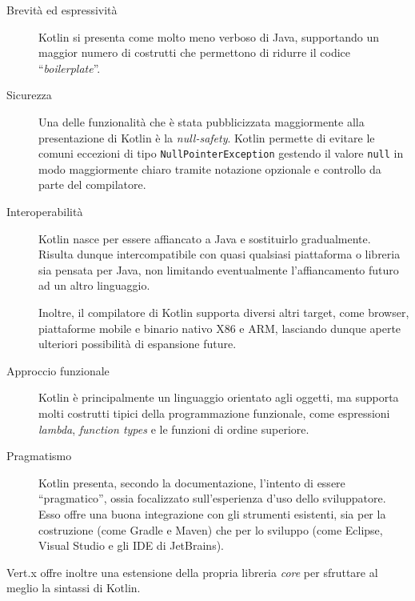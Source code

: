       \begin{description}
        \item[Brevità ed espressività]
          Kotlin si presenta come molto meno verboso di Java, supportando un maggior numero di costrutti che permettono di ridurre il codice ``\emph{boilerplate}''.

        \item[Sicurezza]
          Una delle funzionalità che è stata pubblicizzata maggiormente alla presentazione di Kotlin è la \emph{null-safety}.
          Kotlin permette di evitare le comuni eccezioni di tipo \texttt{NullPointerException} gestendo il valore \texttt{null} in modo maggiormente chiaro tramite notazione opzionale e controllo da parte del compilatore.

        \item[Interoperabilità]
          Kotlin nasce per essere affiancato a Java e sostituirlo gradualmente.
          Risulta dunque intercompatibile con quasi qualsiasi piattaforma o libreria sia pensata per Java, non limitando eventualmente l'affiancamento futuro ad un altro linguaggio.

          Inoltre, il compilatore di Kotlin supporta diversi altri target, come browser, piattaforme mobile e binario nativo X86 e ARM, lasciando dunque aperte ulteriori possibilità di espansione future.

        \item[Approccio funzionale]
          Kotlin è principalmente un linguaggio orientato agli oggetti, ma supporta molti costrutti tipici della programmazione funzionale, come espressioni \emph{lambda}, \emph{function types} e le funzioni di ordine superiore.


        \item[Pragmatismo]
          Kotlin presenta, secondo la documentazione, l'intento di essere ``pragmatico'', ossia focalizzato sull'esperienza d'uso dello sviluppatore.
          Esso offre una buona integrazione con gli strumenti esistenti, sia per la costruzione (come Gradle e Maven) che per lo sviluppo (come Eclipse, Visual Studio e gli IDE di JetBrains).
      \end{description}

      Vert.x offre inoltre una estensione della propria libreria \emph{core} per sfruttare al meglio la sintassi di Kotlin.

